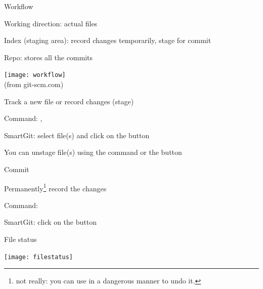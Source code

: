 \documentclass[hyperref,compress,handout,9pt,usepdftitle=false]{beamer}
\begin{document}
\begin{frame}{Workflow}
\begin{witemize}
\item Working direction: actual files
\item Index (staging area): record changes temporarily, stage for commit
\item Repo: stores all the commits
\end{witemize}
\begin{center}
  \texttt{[image: workflow]}\\(from git-scm.com)
\end{center}
\end{frame}

\begin{frame}{Track a new file or record changes (stage)}
\begin{witemize}
\item Command: , 
\item SmartGit: select file(s) and click on the  button
\item You can unstage file(s) using the  command or the  button
\end{witemize}
\end{frame}

\begin{frame}{Commit}
\begin{witemize}
\item Permanently\footnote{not really: you can use  in a dangerous manner to undo it.} record the changes
\item Command: 
\item SmartGit: click on the  button
\end{witemize}
\end{frame}

\begin{frame}{File status}
\begin{center}
  \texttt{[image: filestatus]}
\end{center}
\end{frame}
\end{document}
